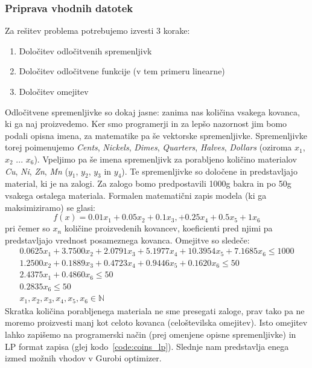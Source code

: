 \documentclass[a4paper,11pt]{article}
\begin{document}
\subsubsection{Priprava vhodnih datotek}
Za rešitev problema potrebujemo izvesti 3 korake:
\begin{enumerate}
\item Določitev odločitvenih spremenljivk
\item Določitev odločitvene funkcije (v tem primeru linearne)
\item Določitev omejitev
\end{enumerate}
Odločitvene spremenljivke so dokaj jasne: zanima nas količina vsakega kovanca, ki ga naj proizvedemo. Ker smo programerji in za lepšo nazornost jim bomo podali opisna imena, za matematike pa še vektorske spremenljivke. Spremenljivke torej poimenujemo \textit{Cents}, \textit{Nickels}, \textit{Dimes}, \textit{Quarters}, \textit{Halves}, \textit{Dollars} (oziroma $x_1$, $x_2$ ... $x_6$). Vpeljimo pa še imena spremenljivk za porabljeno količino materialov \textit{Cu}, \textit{Ni}, \textit{Zn}, \textit{Mn} ($y_1$, $y_2$, $y_3$ in $y_4$). Te spremenljivke so določene in predstavljajo material, ki je na zalogi. Za zalogo bomo predpostavili 1000g bakra in po 50g vsakega ostalega materiala.
Formalen matematični zapis modela (ki ga maksimiziramo) se glasi:
\begin{equation}
	f(x) = 0.01 x_1 + 0.05 x_2 + 0.1 x_3, + 0.25 x_4 + 0.5 x_5 + 1x_6
\end{equation}
pri čemer so $x_n$ količine proizvedenih kovancev, koeficienti pred njimi pa predstavljajo vrednost posameznega kovanca. Omejitve so sledeče:
\begin{equation}
\begin{aligned}
0.0625 x_1 + 3.7500 x_2 + 2.0791 x_3 + 5.1977 x_4 + 10.3954 x_5 + 7.1685 x_6 \leq 1000 \\
1.2500 x_2 + 0.1889 x_3 + 0.4723 x_4 + 0.9446 x_5 + 0.1620 x_6 \leq 50 \\
2.4375 x_1 + 0.4860 x_6 \leq 50 \\
0.2835 x_6 \leq 50 \\
x_1, x_2, x_3, x_4, x_5, x_6 \in \mathbb{N}
\end{aligned}
\end{equation}
Skratka količina porabljenega materiala ne sme presegati zaloge, prav tako pa ne moremo proizvesti manj kot celoto kovanca (celoštevilska omejitev). Isto omejitev lahko zapišemo na programerski način (prej omenjene opisne spremenljivke) in LP format zapisa (glej kodo~\ref{code:coins_lp}). Slednje nam predstavlja enega izmed možnih vhodov v Gurobi optimizer.
\end{document}
